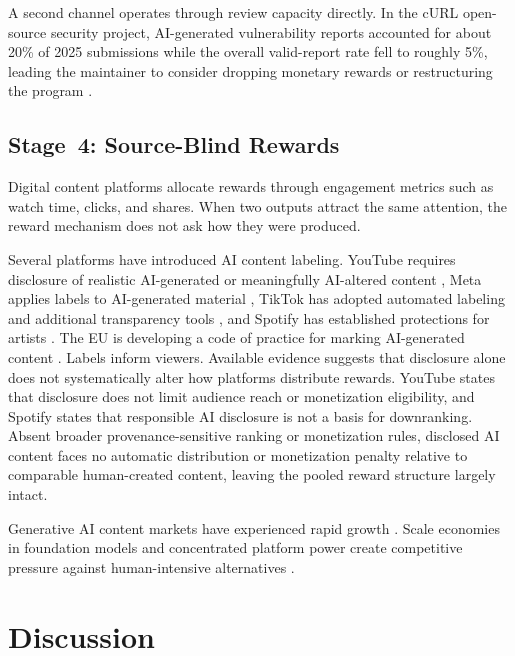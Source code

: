 \documentclass{article}
\theoremstyle{plain}
\theoremstyle{definition}
\theoremstyle{remark}
\begin{document}
A second channel operates through review capacity directly. In the cURL open-source security project, AI-generated vulnerability reports accounted for about 20\% of 2025 submissions while the overall valid-report rate fell to roughly 5\%, leading the maintainer to consider dropping monetary rewards or restructuring the program \citep{stenberg2025deathslops}.

\subsection{Stage~4: Source-Blind Rewards}
\label{sec:stage4}

Digital content platforms allocate rewards through engagement metrics such as watch time, clicks, and shares. When two outputs attract the same attention, the reward mechanism does not ask how they were produced.

Several platforms have introduced AI content labeling. YouTube requires disclosure of realistic AI-generated or meaningfully AI-altered content \citep{youtube2024disclose}, Meta applies labels to AI-generated material \citep{meta2025labeling}, TikTok has adopted automated labeling and additional transparency tools \citep{tiktok2024transparency, tiktok2025labels}, and Spotify has established protections for artists \citep{spotify2025protections}. The EU is developing a code of practice for marking AI-generated content \citep{eu2025codepractice}. Labels inform viewers. Available evidence suggests that disclosure alone does not systematically alter how platforms distribute rewards. YouTube states that disclosure does not limit audience reach or monetization eligibility, and Spotify states that responsible AI disclosure is not a basis for downranking. Absent broader provenance-sensitive ranking or monetization rules, disclosed AI content faces no automatic distribution or monetization penalty relative to comparable human-created content, leaving the pooled reward structure largely intact.

Generative AI content markets have experienced rapid growth \citep{grandview-2025-generative, researchandmarkets-2025-creator}. Scale economies in foundation models and concentrated platform power create competitive pressure against human-intensive alternatives \citep{vipra2023marketconcentrationimplicationsfoundation}.
\vspace{1pt}



\section{Discussion}
\label{sec:discussion}
\end{document}
